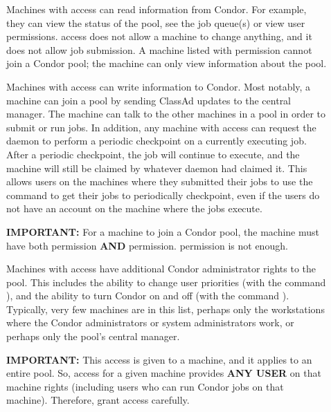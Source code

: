 \begin{description}

\item[] \label{dcperm:read} Machines with 
   access can read information from Condor.  For example, they can
   view the status of the pool, see the job queue(s) or view user
   permissions.   access does not allow a machine to
   change anything, and it does not allow
   job submission. A machine listed
   with  permission cannot join a Condor pool; the machine can
   only view information about the pool.

\item[] \label{dcperm:write} Machines with
    access can write information to Condor.
   Most notably, a machine can join a pool by sending ClassAd
   updates to the central manager. 
   The machine can talk to the other machines
   in a pool in order to submit or run jobs.
   In addition, any machine with
    access can request the  daemon to perform a
   periodic checkpoint on a currently executing job. After a
   periodic checkpoint, the job will continue to execute, and the
   machine will still be claimed by whatever  daemon had claimed it.
   This allows users on the machines where they submitted their jobs
   to use the  command to get their jobs to
   periodically checkpoint, even if the users do not have an account on the
   machine where the jobs execute.

   \textbf{IMPORTANT:} For a machine to join a Condor pool, the machine must
   have both  permission \textbf{AND}  permission.
    permission is not enough.

\item[] \label{dcperm:administrator} Machines
   with  access have additional Condor
   administrator rights to the pool.  This includes the ability to
   change user priorities (with the command ),
   and the ability to turn Condor on and off
   (with the command ).
   Typically, very few
   machines are in this list, perhaps only the workstations where the
   Condor administrators or system administrators work,
   or perhaps only the pool's central manager.

   \textbf{IMPORTANT:} This access is given to a machine,
   and it applies to an entire pool.
   So,  access for a given machine provides
   \textbf{ANY USER} on that machine 
   rights (including users who can run Condor jobs on that machine).
   Therefore, grant  access carefully.


\end{description}
